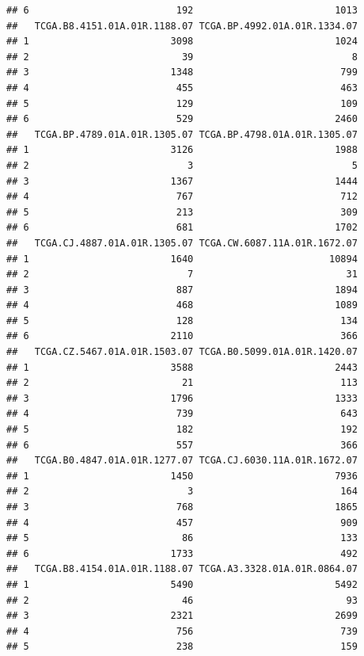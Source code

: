 \documentclass[
]{article}
\begin{document}
\begin{verbatim}
## 6                          192                         1013
##   TCGA.B8.4151.01A.01R.1188.07 TCGA.BP.4992.01A.01R.1334.07
## 1                         3098                         1024
## 2                           39                            8
## 3                         1348                          799
## 4                          455                          463
## 5                          129                          109
## 6                          529                         2460
##   TCGA.BP.4789.01A.01R.1305.07 TCGA.BP.4798.01A.01R.1305.07
## 1                         3126                         1988
## 2                            3                            5
## 3                         1367                         1444
## 4                          767                          712
## 5                          213                          309
## 6                          681                         1702
##   TCGA.CJ.4887.01A.01R.1305.07 TCGA.CW.6087.11A.01R.1672.07
## 1                         1640                        10894
## 2                            7                           31
## 3                          887                         1894
## 4                          468                         1089
## 5                          128                          134
## 6                         2110                          366
##   TCGA.CZ.5467.01A.01R.1503.07 TCGA.B0.5099.01A.01R.1420.07
## 1                         3588                         2443
## 2                           21                          113
## 3                         1796                         1333
## 4                          739                          643
## 5                          182                          192
## 6                          557                          366
##   TCGA.B0.4847.01A.01R.1277.07 TCGA.CJ.6030.11A.01R.1672.07
## 1                         1450                         7936
## 2                            3                          164
## 3                          768                         1865
## 4                          457                          909
## 5                           86                          133
## 6                         1733                          492
##   TCGA.B8.4154.01A.01R.1188.07 TCGA.A3.3328.01A.01R.0864.07
## 1                         5490                         5492
## 2                           46                           93
## 3                         2321                         2699
## 4                          756                          739
## 5                          238                          159

\end{verbatim}
\end{document}
